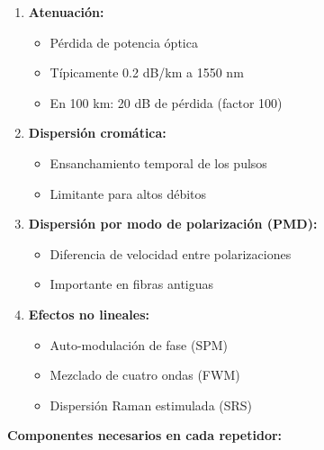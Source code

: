 \documentclass[11pt,a4paper]{article}
\begin{document}
\begin{enumerate}
    \item \textbf{Atenuación:}
    \begin{itemize}
        \item Pérdida de potencia óptica
        \item Típicamente 0.2 dB/km a 1550 nm
        \item En 100 km: 20 dB de pérdida (factor 100)
    \end{itemize}
    
    \item \textbf{Dispersión cromática:}
    \begin{itemize}
        \item Ensanchamiento temporal de los pulsos
        \item Limitante para altos débitos
    \end{itemize}
    
    \item \textbf{Dispersión por modo de polarización (PMD):}
    \begin{itemize}
        \item Diferencia de velocidad entre polarizaciones
        \item Importante en fibras antiguas
    \end{itemize}
    
    \item \textbf{Efectos no lineales:}
    \begin{itemize}
        \item Auto-modulación de fase (SPM)
        \item Mezclado de cuatro ondas (FWM)
        \item Dispersión Raman estimulada (SRS)
    \end{itemize}
\end{enumerate}

\textbf{Componentes necesarios en cada repetidor:}
\end{document}
